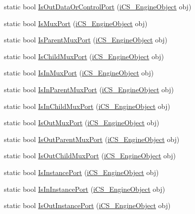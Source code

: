\begin{DoxyCompactItemize}
\item 
static bool \hyperlink{classi_c_s___object_type_a69d14a077b9ff9e011d0e0a71baf7590}{Is\+Out\+Data\+Or\+Control\+Port} (\hyperlink{classi_c_s___engine_object}{i\+C\+S\+\_\+\+Engine\+Object} obj)
\item 
static bool \hyperlink{classi_c_s___object_type_af72fafabe73fa622c2b53d7742c70a18}{Is\+Mux\+Port} (\hyperlink{classi_c_s___engine_object}{i\+C\+S\+\_\+\+Engine\+Object} obj)
\item 
static bool \hyperlink{classi_c_s___object_type_adf9b88d85ba7147372df6cd34287b4fb}{Is\+Parent\+Mux\+Port} (\hyperlink{classi_c_s___engine_object}{i\+C\+S\+\_\+\+Engine\+Object} obj)
\item 
static bool \hyperlink{classi_c_s___object_type_ab098e06866c26cceb687b8405c441689}{Is\+Child\+Mux\+Port} (\hyperlink{classi_c_s___engine_object}{i\+C\+S\+\_\+\+Engine\+Object} obj)
\item 
static bool \hyperlink{classi_c_s___object_type_a9a2f80b347a1a9f92cfce5a0525174e9}{Is\+In\+Mux\+Port} (\hyperlink{classi_c_s___engine_object}{i\+C\+S\+\_\+\+Engine\+Object} obj)
\item 
static bool \hyperlink{classi_c_s___object_type_a3d9d7373a8786787d3d7c37750ab42c7}{Is\+In\+Parent\+Mux\+Port} (\hyperlink{classi_c_s___engine_object}{i\+C\+S\+\_\+\+Engine\+Object} obj)
\item 
static bool \hyperlink{classi_c_s___object_type_a974177a44078fc8b3ad0ae3bd60a7b25}{Is\+In\+Child\+Mux\+Port} (\hyperlink{classi_c_s___engine_object}{i\+C\+S\+\_\+\+Engine\+Object} obj)
\item 
static bool \hyperlink{classi_c_s___object_type_a74d253d6392295dd7a8822566f575071}{Is\+Out\+Mux\+Port} (\hyperlink{classi_c_s___engine_object}{i\+C\+S\+\_\+\+Engine\+Object} obj)
\item 
static bool \hyperlink{classi_c_s___object_type_a15569d578317583d7c53bdb9a5c39588}{Is\+Out\+Parent\+Mux\+Port} (\hyperlink{classi_c_s___engine_object}{i\+C\+S\+\_\+\+Engine\+Object} obj)
\item 
static bool \hyperlink{classi_c_s___object_type_a8d87c563f05458145d35ecb90478d3dc}{Is\+Out\+Child\+Mux\+Port} (\hyperlink{classi_c_s___engine_object}{i\+C\+S\+\_\+\+Engine\+Object} obj)
\item 
static bool \hyperlink{classi_c_s___object_type_a48eed5e3732eb57a1f3958e738e9686a}{Is\+Instance\+Port} (\hyperlink{classi_c_s___engine_object}{i\+C\+S\+\_\+\+Engine\+Object} obj)
\item 
static bool \hyperlink{classi_c_s___object_type_a95df6470baadc70898d14249c96e1862}{Is\+In\+Instance\+Port} (\hyperlink{classi_c_s___engine_object}{i\+C\+S\+\_\+\+Engine\+Object} obj)
\item 
static bool \hyperlink{classi_c_s___object_type_a7e49aac4227a1a184f5f9210dcf16a73}{Is\+Out\+Instance\+Port} (\hyperlink{classi_c_s___engine_object}{i\+C\+S\+\_\+\+Engine\+Object} obj)
\end{DoxyCompactItemize}



